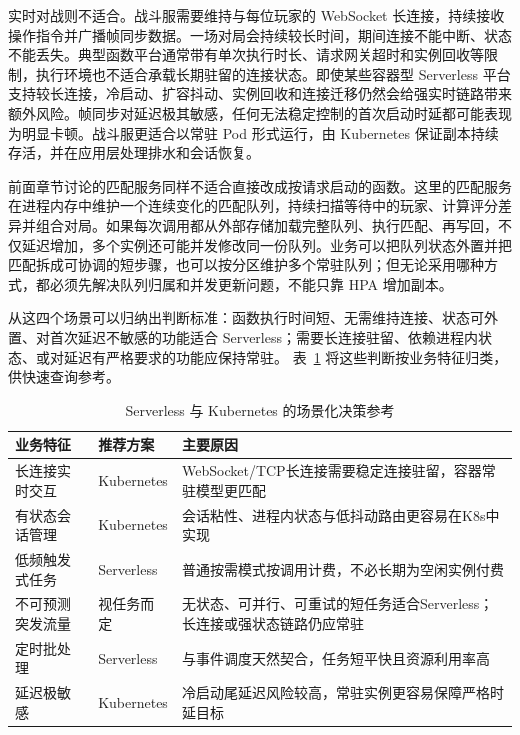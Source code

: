 实时对战则不适合。战斗服需要维持与每位玩家的 WebSocket 长连接，持续接收操作指令并广播帧同步数据。一场对局会持续较长时间，期间连接不能中断、状态不能丢失。典型函数平台通常带有单次执行时长、请求网关超时和实例回收等限制，执行环境也不适合承载长期驻留的连接状态。即使某些容器型 Serverless 平台支持较长连接，冷启动、扩容抖动、实例回收和连接迁移仍然会给强实时链路带来额外风险。帧同步对延迟极其敏感，任何无法稳定控制的首次启动时延都可能表现为明显卡顿。战斗服更适合以常驻 Pod 形式运行，由 Kubernetes 保证副本持续存活，并在应用层处理排水和会话恢复。

前面章节讨论的匹配服务同样不适合直接改成按请求启动的函数。这里的匹配服务在进程内存中维护一个连续变化的匹配队列，持续扫描等待中的玩家、计算评分差异并组合对局。如果每次调用都从外部存储加载完整队列、执行匹配、再写回，不仅延迟增加，多个实例还可能并发修改同一份队列。业务可以把队列状态外置并把匹配拆成可协调的短步骤，也可以按分区维护多个常驻队列；但无论采用哪种方式，都必须先解决队列归属和并发更新问题，不能只靠 HPA 增加副本。

从这四个场景可以归纳出判断标准：函数执行时间短、无需维持连接、状态可外置、对首次延迟不敏感的功能适合 Serverless；需要长连接驻留、依赖进程内状态、或对延迟有严格要求的功能应保持常驻。
表~\ref{tab:serverless-k8s-decision} 将这些判断按业务特征归类，供快速查询参考。

\begin{table}[htbp]
\centering
\caption{Serverless 与 Kubernetes 的场景化决策参考}
\label{tab:serverless-k8s-decision}
{\setlength{\tabcolsep}{4pt}
\begin{tabular}{|p{}|p{}|p{}|}
\hline
业务特征 & 推荐方案 & 主要原因 \\
\hline
长连接实时交互 & Kubernetes & WebSocket/TCP长连接需要稳定连接驻留，容器常驻模型更匹配 \\
\hline
有状态会话管理 & Kubernetes & 会话粘性、进程内状态与低抖动路由更容易在K8s中实现 \\
\hline
低频触发式任务 & Serverless & 普通按需模式按调用计费，不必长期为空闲实例付费 \\
\hline
不可预测突发流量 & 视任务而定 & 无状态、可并行、可重试的短任务适合Serverless；长连接或强状态链路仍应常驻 \\
\hline
定时批处理 & Serverless & 与事件调度天然契合，任务短平快且资源利用率高 \\
\hline
延迟极敏感 & Kubernetes & 冷启动尾延迟风险较高，常驻实例更容易保障严格时延目标 \\
\hline
\end{tabular}
}
\end{table}

